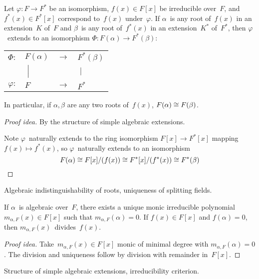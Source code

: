 \begin{thm}
Let \(\varphi:F\to F^*\) be an isomorphism, \(f(x)\in F[x]\) be irreducible over~\(F\), and \(f^*(x)\in F^*[x]\) correspond to~\(f(x)\) under~\(\varphi\). If \(\alpha\)~is any root of~\(f(x)\) in an extension~\(K\) of~\(F\) and \(\beta\)~is any root of~\(f^*(x)\) in an extension~\(K^*\) of~\(F^*\), then \(\varphi\)~extends to an isomorphism \(\Phi:F(\alpha)\to F^*(\beta)\):
\begin{center}
\begin{tabular}{rlll}
\(\Phi:\)&\(F(\alpha)\)&\(\longrightarrow\)&\(F^*(\beta)\)\\
&\(\;\Bigl|\)&&\(\;\Bigr|\)\\
\(\varphi:\)&\(F\)&\(\longrightarrow\)&\(F^*\)
\end{tabular}
\end{center}
In particular, if \(\alpha,\beta\) are any two roots of~\(f(x)\), \(F(\alpha)\cong F(\beta)\).
\end{thm}
\begin{proof}[Proof idea]
By the structure of simple algebraic extensions.

Note \(\varphi\)~naturally extends to the ring isomorphism \(F[x]\to F^*[x]\) mapping \(f(x)\mapsto f^*(x)\), so \(\varphi\)~naturally extends to an isomorphism
\begin{equation*}
F(\alpha)\cong F[x]/(f(x))\cong F^*[x]/(f^*(x))\cong F^*(\beta)\qedhere
\end{equation*}
\end{proof}
\begin{app}
Algebraic indistinguishability of roots, uniqueness of splitting fields.
\end{app}

\begin{thm}
If \(\alpha\)~is algebraic over~\(F\), there exists a unique monic irreducible polynomial~\(m_{\alpha,F}(x)\in F[x]\) such that \(m_{\alpha,F}(\alpha)=0\). If \(f(x)\in F[x]\) and \(f(\alpha)=0\), then \(m_{\alpha,F}(x)\)~divides~\(f(x)\).
\end{thm}
\begin{proof}[Proof idea]
Take~\(m_{\alpha,F}(x)\in F[x]\) monic of minimal degree with \(m_{\alpha,F}(\alpha)=0\). The division and uniqueness follow by division with remainder in~\(F[x]\).
\end{proof}
\begin{app}
Structure of simple algebraic extensions, irreducibility criterion.
\end{app}

